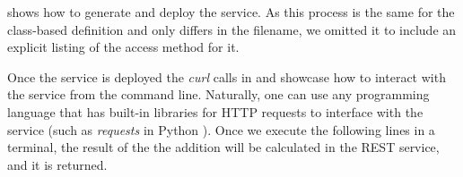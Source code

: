  shows how to generate and deploy the service. As this process is the same for the class-based definition and only differs in the filename, we omitted it to include an explicit listing of the access method for it.

Once the service is deployed the {\em curl} calls in  and  showcase how to interact with the service from the command line. Naturally, one can use any programming language that has built-in libraries for HTTP requests to interface with the service (such as {\em requests} in Python \cite{www-python-requests}). 
Once we execute the following lines in a terminal, the result of the
the addition will be calculated in the REST service, and it is returned.

\newcommand{\FONT}{\tiny}


